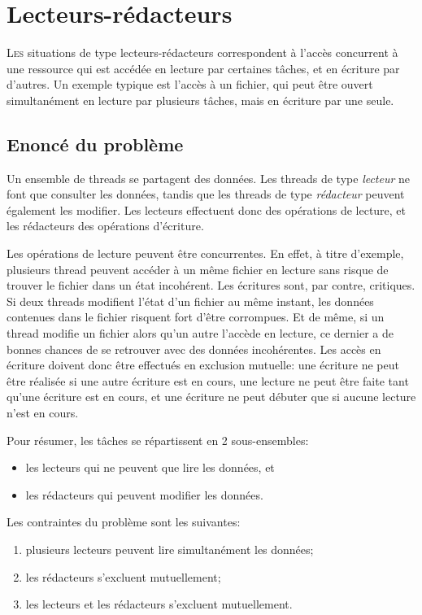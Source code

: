 \chapter{Lecteurs-rédacteurs}
\startchapter

\lettrine[lines=3]{L}{es} situations de type lecteurs-rédacteurs correspondent à l'accès concurrent à une ressource qui est accédée en lecture par certaines tâches, et en écriture par d'autres. Un exemple typique est l'accès à un fichier, qui peut être ouvert simultanément en lecture par plusieurs tâches, mais en écriture par une seule.

\section{Enoncé du problème}
Un ensemble de threads se partagent des données. Les threads de type \emph{lecteur} ne font que consulter les données, tandis que les threads de type \emph{rédacteur} peuvent également les modifier. Les lecteurs effectuent donc des opérations de lecture, et les rédacteurs des opérations d'écriture.

Les opérations de lecture peuvent être concurrentes. En effet, à titre d'exemple, plusieurs thread peuvent accéder à un même fichier en lecture sans risque de trouver le fichier dans un état incohérent. Les écritures sont, par contre, critiques. Si deux threads modifient l'état d'un fichier au même instant, les données contenues dans le fichier risquent fort d'être corrompues. Et de même, si un thread modifie un fichier alors qu'un autre l'accède en lecture, ce dernier a de bonnes chances de se retrouver avec des données incohérentes. Les accès en écriture doivent donc être effectués en exclusion mutuelle: une écriture ne peut être réalisée si une autre écriture est en cours, une lecture ne peut être faite tant qu'une écriture est en cours, et une écriture ne peut débuter que si aucune lecture n'est en cours.

Pour résumer, les tâches se répartissent en 2 sous-ensembles:

\begin{itemize}
  \item les lecteurs qui ne peuvent que lire les données, et
  \item les rédacteurs qui peuvent modifier les données.
\end{itemize}

Les contraintes du problème sont les suivantes:

\begin{enumerate}
  \item plusieurs lecteurs peuvent lire simultanément les données;
  \item les rédacteurs s'excluent mutuellement;
  \item les lecteurs et les rédacteurs s'excluent mutuellement.
\end{enumerate}

